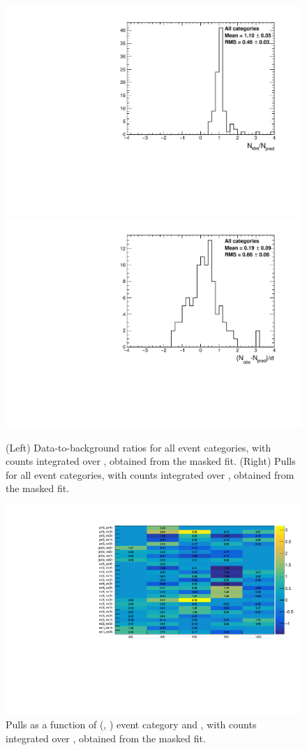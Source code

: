 \begin{figure}[h!]
  \centering
  \caption{(Left) Data-to-background ratios for all event categories,
    with counts integrated over \mht, obtained from the masked
    fit. (Right) Pulls for all event categories, with counts
    integrated over \mht, obtained from the masked fit.}
  \label{fig:ratios_and_pulls}
  \includegraphics[width=0.49\linewidth]{figures/results/36invfb_approval/all/ratios_all_prefit.pdf}
  \includegraphics[width=0.49\linewidth]{figures/results/36invfb_approval/all/pulls_all_prefit.pdf}
\end{figure}

\begin{figure}[h!]
  \centering
  \caption{Pulls as a function of (\njet, \nb) event category and
    \scalht [GeV], with counts integrated over \mht, obtained from the
    masked fit.}
  \label{fig:pulls}
  \includegraphics[width=0.8\linewidth]{figures/results/36invfb_approval/all/pull2D_CROnlyFit.pdf}
\end{figure}

